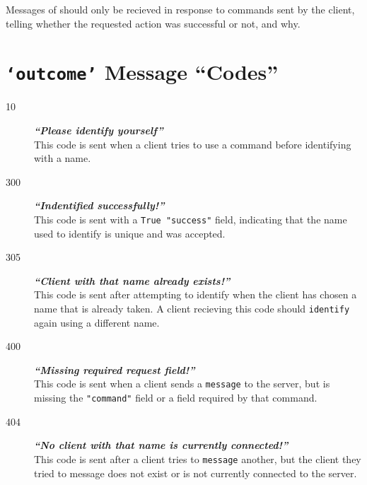 \documentclass[12pt,letterpaper]{article}
\begin{document}
Messages of \outcome  should only be recieved in response to commands sent by the client, telling whether the requested action was successful or not, and why.


\section{\texttt{`outcome'} Message ``Codes''}
\begin{description}
  \item[10] \textbf{\textit{``Please identify yourself''}} \\
    This code is sent when a client tries to use a command before identifying with a name.
  \item[300] \textbf{\textit{``Indentified successfully!''}} \\
    This code is sent with a \texttt{True "success"} field, indicating that the name used to identify is unique and was accepted.
  \item[305] \textbf{\textit{``Client with that name already exists!''}} \\
    This code is sent after attempting to identify when the client has chosen a name that is already taken. A client recieving this code should \texttt{identify} again using a different name.
  \item[400] \textbf{\textit{``Missing required request field!''}} \\
    This code is sent when a client sends a \texttt{message} to the server, but is missing the \texttt{"command"} field or a field required by that command.
  \item[404] \textbf{\textit{``No client with that name is currently connected!''}} \\
    This code is sent after a client tries to \texttt{message} another, but the client they tried to message does not exist or is not currently connected to the server.
\end{description}
\end{document}
